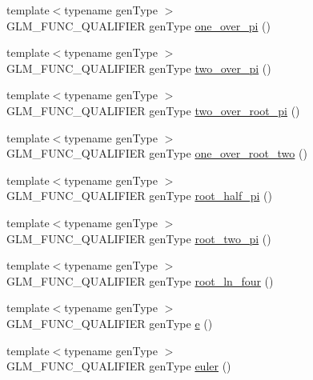 \begin{DoxyCompactItemize}
{\footnotesize template$<$typename gen\+Type $>$ }\\G\+L\+M\+\_\+\+F\+U\+N\+C\+\_\+\+Q\+U\+A\+L\+I\+F\+I\+ER gen\+Type \hyperlink{group__gtc__constants_ga9ba09a027db6d4f4e259b01cf5d6c178}{one\+\_\+over\+\_\+pi} ()
\item 
{\footnotesize template$<$typename gen\+Type $>$ }\\G\+L\+M\+\_\+\+F\+U\+N\+C\+\_\+\+Q\+U\+A\+L\+I\+F\+I\+ER gen\+Type \hyperlink{group__gtc__constants_ga85729d38c47351686e8659f80447a7ea}{two\+\_\+over\+\_\+pi} ()
\item 
{\footnotesize template$<$typename gen\+Type $>$ }\\G\+L\+M\+\_\+\+F\+U\+N\+C\+\_\+\+Q\+U\+A\+L\+I\+F\+I\+ER gen\+Type \hyperlink{group__gtc__constants_ga767e539c20585bf60aa63595b0f0b259}{two\+\_\+over\+\_\+root\+\_\+pi} ()
\item 
{\footnotesize template$<$typename gen\+Type $>$ }\\G\+L\+M\+\_\+\+F\+U\+N\+C\+\_\+\+Q\+U\+A\+L\+I\+F\+I\+ER gen\+Type \hyperlink{group__gtc__constants_gac1a9b3248357fd9e9b740bed90e0b1b7}{one\+\_\+over\+\_\+root\+\_\+two} ()
\item 
{\footnotesize template$<$typename gen\+Type $>$ }\\G\+L\+M\+\_\+\+F\+U\+N\+C\+\_\+\+Q\+U\+A\+L\+I\+F\+I\+ER gen\+Type \hyperlink{group__gtc__constants_gaec5af85e2148c118aad7e797430fdeb0}{root\+\_\+half\+\_\+pi} ()
\item 
{\footnotesize template$<$typename gen\+Type $>$ }\\G\+L\+M\+\_\+\+F\+U\+N\+C\+\_\+\+Q\+U\+A\+L\+I\+F\+I\+ER gen\+Type \hyperlink{group__gtc__constants_gae991b4d39c57b57990054eec3677597c}{root\+\_\+two\+\_\+pi} ()
\item 
{\footnotesize template$<$typename gen\+Type $>$ }\\G\+L\+M\+\_\+\+F\+U\+N\+C\+\_\+\+Q\+U\+A\+L\+I\+F\+I\+ER gen\+Type \hyperlink{group__gtc__constants_ga9cae3fad9314e34c1d3aab71fcdef05f}{root\+\_\+ln\+\_\+four} ()
\item 
{\footnotesize template$<$typename gen\+Type $>$ }\\G\+L\+M\+\_\+\+F\+U\+N\+C\+\_\+\+Q\+U\+A\+L\+I\+F\+I\+ER gen\+Type \hyperlink{group__gtc__constants_gab83fb6de0f05d6c0d11bdf0479f8319e}{e} ()
\item 
{\footnotesize template$<$typename gen\+Type $>$ }\\G\+L\+M\+\_\+\+F\+U\+N\+C\+\_\+\+Q\+U\+A\+L\+I\+F\+I\+ER gen\+Type \hyperlink{group__gtc__constants_ga6f14b46653b7ead1edcbd0fc6c9c5289}{euler} ()

\end{DoxyCompactItemize}
